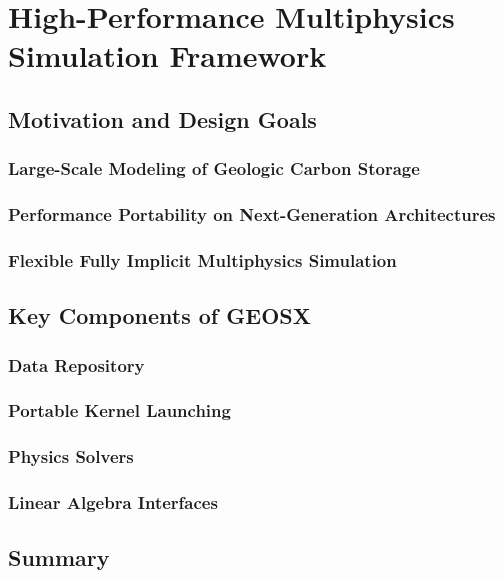 \chapter{High-Performance Multiphysics Simulation Framework}
\label{ch:geosx_framework}

\section{Motivation and Design Goals}

\subsection{Large-Scale Modeling of Geologic Carbon Storage}

\subsection{Performance Portability on Next-Generation Architectures}

\subsection{Flexible Fully Implicit Multiphysics Simulation}

\section{Key Components of GEOSX}

\subsection{Data Repository}

\subsection{Portable Kernel Launching}

\subsection{Physics Solvers}

\subsection{Linear Algebra Interfaces}

\section{Summary}